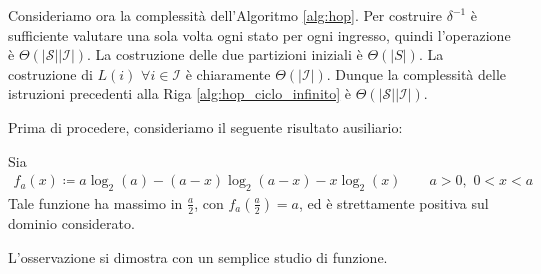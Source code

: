 Consideriamo ora la complessità dell'Algoritmo \ref{alg:hop}. Per costruire $\delta^{-1}$ è sufficiente valutare una sola volta ogni stato per ogni ingresso, quindi l'operazione è $\Theta(|\mathcal{S}||\mathcal{I}|)$. La costruzione delle due partizioni iniziali è $\Theta(|S|)$. La costruzione di $L(i) \,\,\forall i \in \mathcal{I}$ è chiaramente $\Theta(|\mathcal{I}|)$. Dunque la complessità delle istruzioni precedenti alla Riga \ref{alg:hop_ciclo_infinito} è $\Theta(|\mathcal{S}||\mathcal{I}|)$.

Prima di procedere, consideriamo il seguente risultato ausiliario:
\begin{lemma}
    \label{lem:log}
    Sia
    \begin{gather*}
        f_a(x) \coloneqq a\log_2(a) - (a-x)\log_2(a-x) - x\log_2(x) \qquad a > 0,\,\, 0 < x < a
    \end{gather*}
    Tale funzione ha massimo in $\frac{a}{2}$, con $f_a(\frac{a}{2}) = a$, ed è strettamente positiva sul dominio considerato.
\end{lemma}
\begin{proof2}
    L'osservazione si dimostra con un semplice studio di funzione.
\end{proof2}

